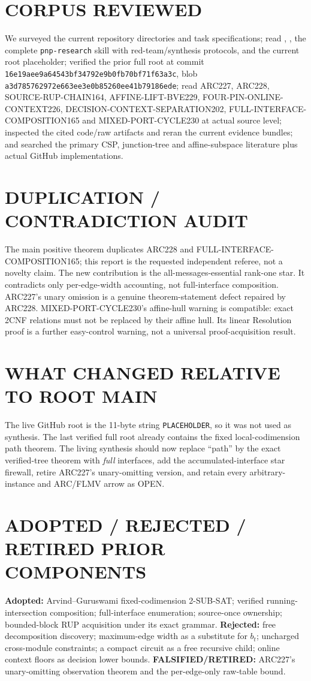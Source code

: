 \documentclass[11pt]{article}
\begin{document}
\section{CORPUS REVIEWED}
We surveyed the current repository directories and task specifications; read
, , the complete
\texttt{pnp-research} skill with red-team/synthesis protocols, and the current
root placeholder; verified the prior full root at commit
\texttt{16e19aee9a64543bf34792e9b0fb70bf71f63a3c}, blob
\texttt{a3d785762972e663ee3e0b85260ee41b79186ede}; read ARC227,
ARC228, SOURCE-RUP-CHAIN164, AFFINE-LIFT-BVE229,
FOUR-PIN-ONLINE-CONTEXT226, DECISION-CONTEXT-SEPARATION202,
FULL-INTERFACE-COMPOSITION165 and MIXED-PORT-CYCLE230 at actual source level;
inspected the cited code/raw artifacts and reran the current evidence bundles;
and searched the primary CSP, junction-tree and affine-subspace literature plus
actual GitHub implementations.

\section{DUPLICATION / CONTRADICTION AUDIT}
The main positive theorem duplicates ARC228 and FULL-INTERFACE-COMPOSITION165;
this report is the requested independent referee, not a novelty claim.  The
new contribution is the all-messages-essential rank-one star.  It contradicts
only per-edge-width accounting, not full-interface composition.  ARC227's
unary omission is a genuine theorem-statement defect repaired by ARC228.
MIXED-PORT-CYCLE230's affine-hull warning is compatible: exact 2CNF relations
must not be replaced by their affine hull.  Its linear Resolution proof is a
further easy-control warning, not a universal proof-acquisition result.

\section{WHAT CHANGED RELATIVE TO ROOT MAIN}
The live GitHub root is the 11-byte string \texttt{PLACEHOLDER}, so it was not
used as synthesis.  The last verified full root already contains the fixed
local-codimension path theorem.  The living synthesis should now replace
``path'' by the exact verified-tree theorem with \emph{full} interfaces, add
the accumulated-interface star firewall, retire ARC227's unary-omitting
version, and retain every arbitrary-instance and ARC/FLMV arrow as OPEN.

\section{ADOPTED / REJECTED / RETIRED PRIOR COMPONENTS}
\textbf{Adopted:} Arvind--Guruswami fixed-codimension 2-SUB-SAT; verified
running-intersection composition; full-interface enumeration; source-once
ownership; bounded-block RUP acquisition under its exact grammar.
\textbf{Rejected:} free decomposition discovery; maximum-edge width as a
substitute for $b_t$; uncharged cross-module constraints; a compact circuit
as a free recursive child; online context floors as decision lower bounds.
\textbf{FALSIFIED/RETIRED:} ARC227's unary-omitting observation theorem and
the per-edge-only raw-table bound.
\end{document}
